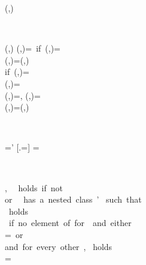 \begin{RuleFrame}
\begin{MDefinition}{\extractDec(\ctxVal,\x)}
\end{MDefinition}
\\
\begin{MDefinition}{\class(\ctxVal,\val)}
\class(\ctxVal,\x)=\C\ \mbox{if}\ \extractDec(\ctxVal,\x)=\Dec{\_}{\x}{\MethCall{\C}\m{\_}}\\
\class(\ctxVal,\x)=\class(\ctxVal,\Vd{}{\dvs}{\val})
\\\quad \mbox{if}\ \extractDec(\ctxVal,\x)=\Dec{\Type{\IMdf}{\_}{\_}}{\x}{\Vd{}{\dvs}{\val}}\\
\class(\ctxVal,\Path)=\Path\\
\class(\ctxVal,\voidKw)=\VoidKw,
\class(\ctxVal,\classB)=\LibraryKw\\
\class(\ctxVal,\Vd{}\dvs\val)=\class(\ctxVal[\Vd{}{\dvs}{\hole}],\val)\\
\end{MDefinition}
\\
\begin{MDefinition}{\dvs[\x.\m=\atom]=\dvs'}
\dvs \Dec\T\x\Path\Mc{}[\x.\Opt{\,\hash\,}\y=\atom]
\!=\!
\dvs \Dec\T\x\Path\Mc{}
\\
\end{MDefinition}
\\
\begin{MDefinition}{\AbstractClass\p{\classB},\ \Coherent\p{\classB}}
\AbstractClass\p{\classB}\mbox{ holds if not }\Coherent\p{\classB}\\
\mbox{or } \classB\mbox{ has a nested class }\C\colon\classB' \mbox{ such that }
\AbstractClass{}
\\
\Coherent\p{\Cb{\interfaceKw\_}^{\Opt\typeLabel}}\mbox{ holds}\\
\Coherent\p{
\Cb{\h\implSign\, \Many{\Path}\vT\,\Many\mhT\, \members}^{\Opt\typeLabel}
}\mbox{ if no element of for }\mhT\in \members \mbox{ and either}\\
\Many\mhT=\emptyset\mbox{ or }
\in\Many\mhT\\
\mbox{and for every other }\mhT\in\Many\mhT,
\Coherent\p{\mdf,\Many{\ft{}{\x}{\T}},\mhT}\mbox{ holds}\\
\Coherent\p{\mdf,\Many{\ft{}{\x}{\T}},\mhT}=
\Coherent\p{\mdf,\Norm\p{\Many{\ft{}{\x}{\T}}},\mhT}\\



\end{MDefinition}
\end{RuleFrame}
